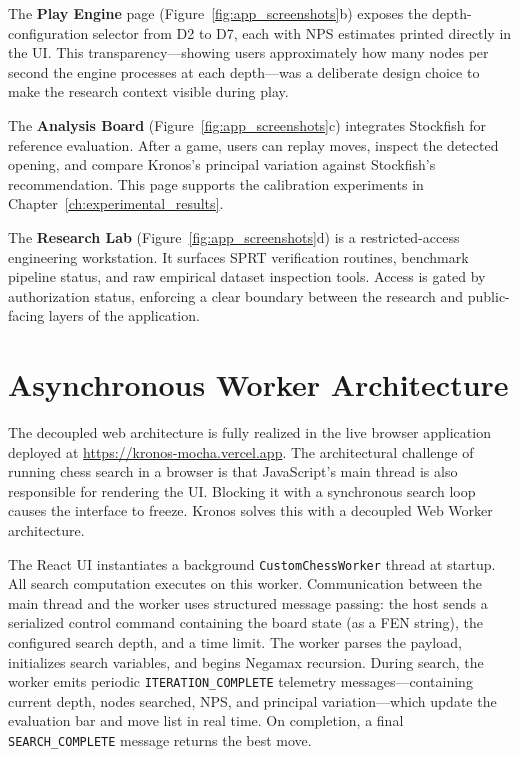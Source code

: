 The \textbf{Play Engine} page (Figure~\ref{fig:app_screenshots}b) exposes the depth-configuration selector from D2 to D7, each with NPS estimates printed directly in the UI. This transparency—showing users approximately how many nodes per second the engine processes at each depth—was a deliberate design choice to make the research context visible during play.

The \textbf{Analysis Board} (Figure~\ref{fig:app_screenshots}c) integrates Stockfish for reference evaluation. After a game, users can replay moves, inspect the detected opening, and compare Kronos's principal variation against Stockfish's recommendation. This page supports the calibration experiments in Chapter~\ref{ch:experimental_results}.

The \textbf{Research Lab} (Figure~\ref{fig:app_screenshots}d) is a restricted-access engineering workstation. It surfaces SPRT verification routines, benchmark pipeline status, and raw empirical dataset inspection tools. Access is gated by authorization status, enforcing a clear boundary between the research and public-facing layers of the application.

\section{Asynchronous Worker Architecture}
The decoupled web architecture is fully realized in the live browser application deployed at \url{https://kronos-mocha.vercel.app}. The architectural challenge of running chess search in a browser is that JavaScript's main thread is also responsible for rendering the UI. Blocking it with a synchronous search loop causes the interface to freeze. Kronos solves this with a decoupled Web Worker architecture.

The React UI instantiates a background \texttt{CustomChessWorker} thread at startup. All search computation executes on this worker. Communication between the main thread and the worker uses structured message passing: the host sends a serialized control command containing the board state (as a FEN string), the configured search depth, and a time limit. The worker parses the payload, initializes search variables, and begins Negamax recursion. During search, the worker emits periodic \texttt{ITERATION\_COMPLETE} telemetry messages—containing current depth, nodes searched, NPS, and principal variation—which update the evaluation bar and move list in real time. On completion, a final \texttt{SEARCH\_COMPLETE} message returns the best move.

